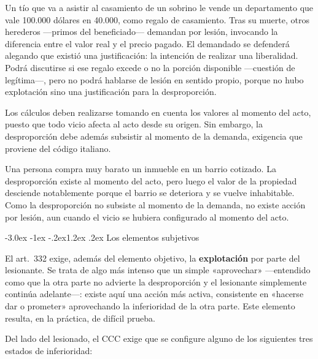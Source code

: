 \documentclass[12pt,oneside]{book}
\makeatletter
\renewcommand\section{\@startsection{section}{1}{\z@}%
  {-3.0ex \@plus -1ex \@minus -.2ex}{1.2ex \@plus .2ex}%
  {\normalfont\large\bfseries\color{acento}}}
\makeatother
\begin{document}
\begin{ejemplo}
Un tío que va a asistir al casamiento de un sobrino le vende un departamento que vale 100.000 dólares en 40.000, como regalo de casamiento. Tras su muerte, otros herederos ---primos del beneficiado--- demandan por lesión, invocando la diferencia entre el valor real y el precio pagado. El demandado se defenderá alegando que existió una justificación: la intención de realizar una liberalidad. Podrá discutirse si ese regalo excede o no la porción disponible ---cuestión de legítima---, pero no podrá hablarse de lesión en sentido propio, porque no hubo explotación sino una justificación para la desproporción.
\end{ejemplo}

Los cálculos deben realizarse tomando en cuenta los valores al momento del acto, puesto que todo vicio afecta al acto desde su origen. Sin embargo, la desproporción debe además subsistir al momento de la demanda, exigencia que proviene del código italiano.

\begin{ejemplo}
Una persona compra muy barato un inmueble en un barrio cotizado. La desproporción existe al momento del acto, pero luego el valor de la propiedad desciende notablemente porque el barrio se deteriora y se vuelve inhabitable. Como la desproporción no subsiste al momento de la demanda, no existe acción por lesión, aun cuando el vicio se hubiera configurado al momento del acto.
\end{ejemplo}

\section{Los elementos subjetivos}

El art.\ 332 exige, además del elemento objetivo, la \textbf{explotación} por parte del lesionante. Se trata de algo más intenso que un simple «aprovechar» ---entendido como que la otra parte no advierte la desproporción y el lesionante simplemente continúa adelante---: existe aquí una acción más activa, consistente en «hacerse dar o prometer» aprovechando la inferioridad de la otra parte. Este elemento resulta, en la práctica, de difícil prueba.

Del lado del lesionado, el CCC exige que se configure alguno de los siguientes tres estados de inferioridad:
\end{document}
